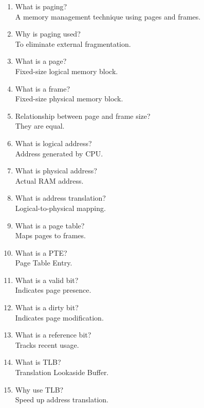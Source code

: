 \begin{enumerate}
\item What is paging?\\
A memory management technique using pages and frames.

\item Why is paging used?\\
To eliminate external fragmentation.

\item What is a page?\\
Fixed-size logical memory block.

\item What is a frame?\\
Fixed-size physical memory block.

\item Relationship between page and frame size?\\
They are equal.

\item What is logical address?\\
Address generated by CPU.

\item What is physical address?\\
Actual RAM address.

\item What is address translation?\\
Logical-to-physical mapping.

\item What is a page table?\\
Maps pages to frames.

\item What is a PTE?\\
Page Table Entry.

\item What is a valid bit?\\
Indicates page presence.

\item What is a dirty bit?\\
Indicates page modification.

\item What is a reference bit?\\
Tracks recent usage.

\item What is TLB?\\
Translation Lookaside Buffer.

\item Why use TLB?\\
Speed up address translation.


\end{enumerate}
